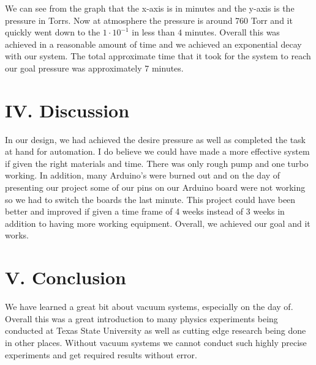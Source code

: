\documentclass[aps,prl,twocolumn,showpacs,superscriptaddress,groupedaddress]{revtex4}  %
\begin{document}
We can see from the graph that the x-axis is in minutes and the y-axis is the pressure in Torrs. Now at atmosphere the pressure is around 760 Torr and it quickly went down to the $1\cdot 10^{-1}$ in less than $4$ minutes. Overall this was achieved in a reasonable amount of time and we achieved an exponential decay with our system. The total approximate time that it took for the system to reach our goal pressure was approximately 7 minutes. 

\section{\label{sec: level4}IV. Discussion}
In our design, we had achieved the desire pressure as well as completed the task at hand for automation. I do believe we could have made a more effective system if given the right materials and time. There was only rough pump and one turbo working. In addition, many Arduino's were burned out and on the day of presenting our project some of our pins on our Arduino board were not working so we had to switch the boards the last minute. This project could have been better and improved if given a time frame of 4 weeks instead of 3 weeks in addition to having more working equipment. Overall, we achieved our goal and it works.

\section{\label{sec: level5}V. Conclusion}
We have learned a great bit about vacuum systems, especially on the day of. Overall this was a great introduction to many physics experiments being conducted at Texas State University as well as cutting edge research being done in other places. Without vacuum systems we cannot conduct such highly precise experiments and get required results without error. 
\end{document}
